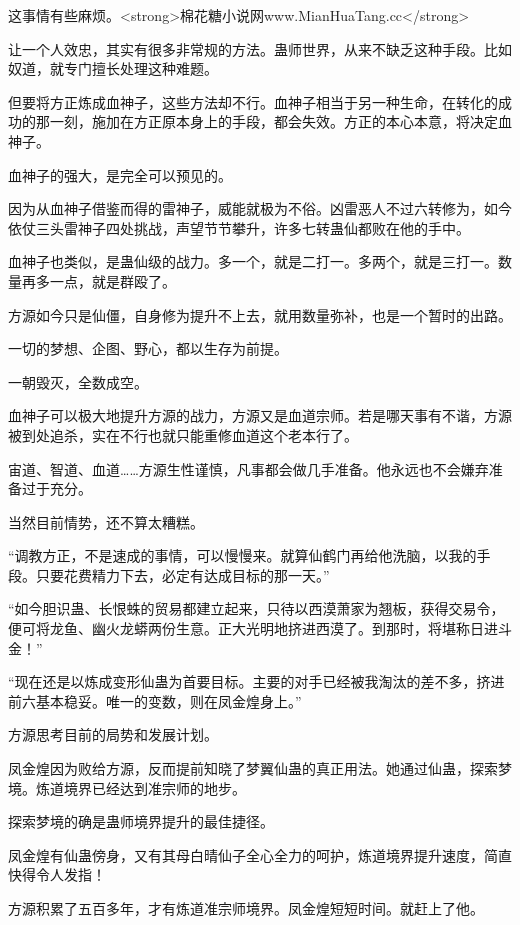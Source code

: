 
\begin{this_body}

这事情有些麻烦。<strong>棉花糖小说网www.MianHuaTang.cc</strong>

让一个人效忠，其实有很多非常规的方法。蛊师世界，从来不缺乏这种手段。比如奴道，就专门擅长处理这种难题。

但要将方正炼成血神子，这些方法却不行。血神子相当于另一种生命，在转化的成功的那一刻，施加在方正原本身上的手段，都会失效。方正的本心本意，将决定血神子。

血神子的强大，是完全可以预见的。

因为从血神子借鉴而得的雷神子，威能就极为不俗。凶雷恶人不过六转修为，如今依仗三头雷神子四处挑战，声望节节攀升，许多七转蛊仙都败在他的手中。

血神子也类似，是蛊仙级的战力。多一个，就是二打一。多两个，就是三打一。数量再多一点，就是群殴了。

方源如今只是仙僵，自身修为提升不上去，就用数量弥补，也是一个暂时的出路。

一切的梦想、企图、野心，都以生存为前提。

一朝毁灭，全数成空。

血神子可以极大地提升方源的战力，方源又是血道宗师。若是哪天事有不谐，方源被到处追杀，实在不行也就只能重修血道这个老本行了。

宙道、智道、血道……方源生性谨慎，凡事都会做几手准备。他永远也不会嫌弃准备过于充分。

当然目前情势，还不算太糟糕。

“调教方正，不是速成的事情，可以慢慢来。就算仙鹤门再给他洗脑，以我的手段。只要花费精力下去，必定有达成目标的那一天。”

“如今胆识蛊、长恨蛛的贸易都建立起来，只待以西漠萧家为翘板，获得交易令，便可将龙鱼、幽火龙蟒两份生意。正大光明地挤进西漠了。到那时，将堪称日进斗金！”

“现在还是以炼成变形仙蛊为首要目标。主要的对手已经被我淘汰的差不多，挤进前六基本稳妥。唯一的变数，则在凤金煌身上。”

方源思考目前的局势和发展计划。

凤金煌因为败给方源，反而提前知晓了梦翼仙蛊的真正用法。她通过仙蛊，探索梦境。炼道境界已经达到准宗师的地步。

探索梦境的确是蛊师境界提升的最佳捷径。

凤金煌有仙蛊傍身，又有其母白晴仙子全心全力的呵护，炼道境界提升速度，简直快得令人发指！

方源积累了五百多年，才有炼道准宗师境界。凤金煌短短时间。就赶上了他。


\end{this_body}
